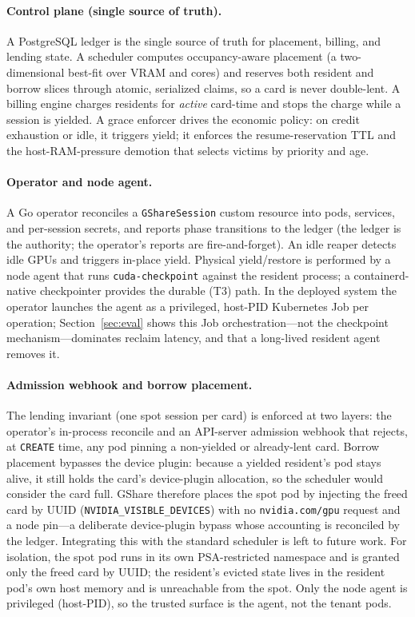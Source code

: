 \documentclass[preprint,12pt]{elsarticle}
\begin{document}
\paragraph{Control plane (single source of truth).}
A PostgreSQL ledger is the single source of truth for placement, billing, and lending state. A scheduler
computes occupancy-aware placement (a two-dimensional best-fit over VRAM and cores) and reserves both
resident and borrow slices through atomic, serialized claims, so a card is never double-lent. A billing
engine charges residents for \emph{active} card-time and stops the charge while a session is yielded. A
grace enforcer drives the economic policy: on credit exhaustion or idle, it triggers yield; it enforces the
resume-reservation TTL and the host-RAM-pressure demotion that selects victims by priority and age.

\paragraph{Operator and node agent.}
A Go operator reconciles a \texttt{GShareSession} custom resource into pods, services, and per-session
secrets, and reports phase transitions to the ledger (the ledger is the authority; the operator's reports
are fire-and-forget). An idle reaper detects idle GPUs and triggers in-place yield. Physical
yield/restore is performed by a node agent that runs \texttt{cuda-checkpoint} against the resident process;
a containerd-native checkpointer provides the durable (T3) path. In the deployed system the operator
launches the agent as a privileged, host-PID Kubernetes Job per operation; Section~\ref{sec:eval} shows
this Job orchestration---not the checkpoint mechanism---dominates reclaim latency, and that a long-lived
resident agent removes it.

\paragraph{Admission webhook and borrow placement.}
The lending invariant (one spot session per card) is enforced at two layers: the operator's in-process
reconcile and an API-server admission webhook that rejects, at \texttt{CREATE} time, any pod pinning a
non-yielded or already-lent card. Borrow placement bypasses the device plugin: because a yielded
resident's pod stays alive, it still holds the card's device-plugin allocation, so the scheduler would
consider the card full. GShare therefore places the spot pod by injecting the freed card by UUID
(\texttt{NVIDIA\_VISIBLE\_DEVICES}) with no \texttt{nvidia.com/gpu} request and a node pin---a deliberate
device-plugin bypass whose accounting is reconciled by the ledger. Integrating this with the standard
scheduler is left to future work. For isolation, the spot pod runs in its own PSA-restricted namespace and
is granted only the freed card by UUID; the resident's evicted state lives in the resident pod's own host
memory and is unreachable from the spot. Only the node agent is privileged (host-PID), so the trusted
surface is the agent, not the tenant pods.
\end{document}
